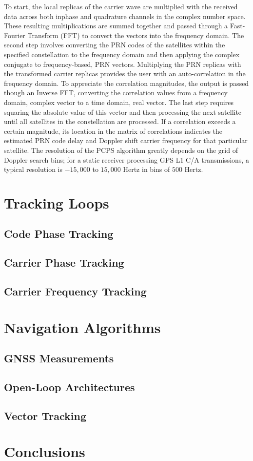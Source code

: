 To start, the local replicas of the carrier wave are multiplied with the received data across both inphase and quadrature channels in the complex number space. These resulting multiplications are summed together and passed through a Fast-Fourier Transform (FFT) to convert the vectors into the frequency domain. The second step involves converting the PRN codes of the satellites within the specified constellation to the frequency domain and then applying the complex conjugate to frequency-based, PRN vectors. Multiplying the PRN replicas with the transformed carrier replicas provides the user with an auto-correlation in the frequency domain. To appreciate the correlation magnitudes, the output is passed though an Inverse FFT, converting the correlation values from a frequency domain, complex vector to a time domain, real vector. The last step requires squaring the absolute value of this vector and then processing the next satellite until all satellites in the constellation are processed. If a correlation exceeds a certain magnitude, its location in the matrix of correlations indicates the estimated PRN code delay and Doppler shift carrier frequency for that particular satellite. The resolution of the PCPS algorithm greatly depends on the grid of Doppler search bins; for a static receiver processing GPS L1 C/A transmissions, a typical resolution is \(-15,000\) to \(15,000\) Hertz in bins of \(500\) Hertz.

\section{Tracking Loops}
\subsection{Code Phase Tracking}
\subsection{Carrier Phase Tracking}
\subsection{Carrier Frequency Tracking}

\section{Navigation Algorithms}
\subsection{GNSS Measurements}
\subsection{Open-Loop Architectures}
\subsection{Vector Tracking}

\section{Conclusions}